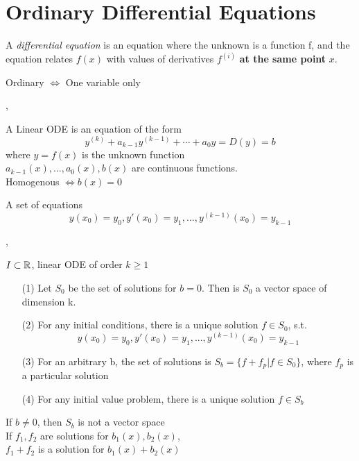 \part{Ordinary Differential Equations}
\setcounter{section}{0}

\Def A \textit{differential equation} is an equation where the unknown is a function f, and the equation relates $f(x)$ with values of derivatives $f^{(i)}$ \textbf{at the same point} $x$.

\Def Ordinary $\iff$ One variable only

\sep

\Def A Linear ODE is an equation of the form
\[ y^{(k)} + a_{k - 1} y^{(k - 1)} + \cdots + a_0 y = D(y) = b \] 
where $y = f(x)$ is the unknown function \\
$a_{k - 1}(x), ..., a_0(x), b(x)$ are continuous functions. \\

\Def Homogenous $ \iff b(x) = 0$ 

 A set of equations
\[y(x_0) = y_0, y'(x_0) = y_1, ..., y^{(k - 1)}(x_0) = y_{k - 1} \]

\sep

\Satz[2.2.3] $I \subset \mathbb{R}$,  linear ODE of order $k \geq 1$
\begin{enumerate}
\item[(1)] Let $S_0$ be the set of solutions for $b = 0$. Then is $S_0$ a vector space of dimension k.
\item[(2)] For any initial conditions, there is a unique solution $f \in S_0$, s.t.
\[y(x_0) = y_0, y'(x_0) = y_1, ..., y^{(k - 1)}(x_0) = y_{k - 1} \]

\item[(3)] For an arbitrary b, the set of solutions is $S_b = \{f + f_p | f \in S_0\}$, where $f_p$ is a particular solution
\item[(4)] For any initial value problem, there is a unique solution $f \in S_b$
\end{enumerate}
\Bem If $b \neq 0$, then $S_b$ is not a vector space \\
\Bem If $f_1, f_2$ are solutions for $b_1(x), b_2(x)$, \\ $f_1 + f_2$ is a solution for $b_1(x) + b_2(x)$




